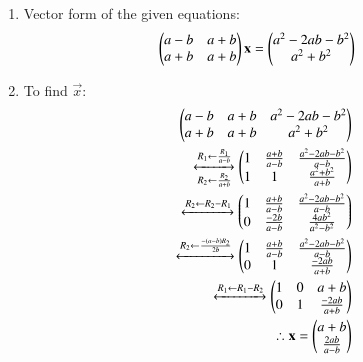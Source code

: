 \renewcommand{\theequation}{\theenumi}
\begin{enumerate}[label=\thesubsection.\arabic*.,ref=\thesubsection.\theenumi]

\item Vector form of the given equations:
\begin{align}
\begin{pmatrix}a-b & a+b \\
a+b & a+b
\end{pmatrix}\mathbf{x} &= \begin{pmatrix}a^2-2ab-b^2\\a^2 + b ^2\end{pmatrix}
\end{align}

\item To find $\vec{x}$:
\begin{align}
\begin{pmatrix}a-b & a+b & a^2-2ab-b^2  \\
a+b & a+b & a^2+b^2 
\end{pmatrix}\nonumber \\
\xleftrightarrow[R_2 \leftarrow \frac{R_2}{a+b}]{R_1 \leftarrow \frac{R_1}{a-b}}
\begin{pmatrix}1 & \frac{a+b}{a-b} & \frac{a^2-2ab-b^2}{a-b}  \\
1 & 1 & \frac{a^2+b^2}{a+b}
\end{pmatrix}\\
\xleftrightarrow[]{R_2 \leftarrow R_2 - R_1}
\begin{pmatrix}1 & \frac{a+b}{a-b} & \frac{a^2-2ab-b^2}{a-b}  \\
0 & \frac{-2b}{a-b} & \frac{4ab^2}{a^2-b^2}
\end{pmatrix}\\
\xleftrightarrow[]{R_2 \leftarrow  \frac{-\ensuremath{\left(a-b\right)}R_2}{2b}}
\begin{pmatrix}1 & \frac{a+b}{a-b} & \frac{a^2-2ab-b^2}{a-b}  \\
0 & 1 & \frac{-2ab}{a+b}
\end{pmatrix}\\
\xleftrightarrow[]{R_1 \leftarrow  R_1 - R_2}
\begin{pmatrix}1 & 0 & a+b \\
0 & 1 & \frac{-2ab}{a+b}
\end{pmatrix}\\
\therefore \mathbf{x} = \begin{pmatrix}a+b\\ \frac{2ab}{a-b}\end{pmatrix}
\end{align}

\end{enumerate}



%
